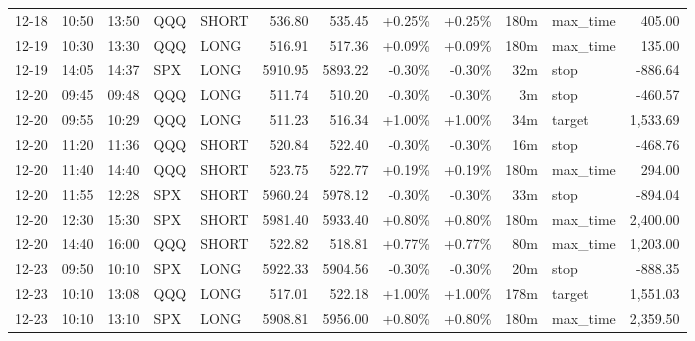 \documentclass[11pt,a4paper]{article}
\begin{document}
\begin{center}
\begin{longtable}{>{\color{txtmain}}l l l l l r r r r r >{\color{txtmain}}l r}
12-18 & 10:50 & 13:50 & QQQ & SHORT & 536.80 & 535.45 & \textcolor{wingreen}{+0.25\%} & \textcolor{wingreen}{+0.25\%} & 180m & max\_time & \textcolor{wingreen}{405.00} \\
12-19 & 10:30 & 13:30 & QQQ & LONG & 516.91 & 517.36 & \textcolor{wingreen}{+0.09\%} & \textcolor{wingreen}{+0.09\%} & 180m & max\_time & \textcolor{wingreen}{135.00} \\
12-19 & 14:05 & 14:37 & SPX & LONG & 5910.95 & 5893.22 & \textcolor{lossred}{-0.30\%} & \textcolor{lossred}{-0.30\%} & 32m & stop & \textcolor{lossred}{-886.64} \\
12-20 & 09:45 & 09:48 & QQQ & LONG & 511.74 & 510.20 & \textcolor{lossred}{-0.30\%} & \textcolor{lossred}{-0.30\%} & 3m & stop & \textcolor{lossred}{-460.57} \\
12-20 & 09:55 & 10:29 & QQQ & LONG & 511.23 & 516.34 & \textcolor{wingreen}{+1.00\%} & \textcolor{wingreen}{+1.00\%} & 34m & target & \textcolor{wingreen}{1,533.69} \\
12-20 & 11:20 & 11:36 & QQQ & SHORT & 520.84 & 522.40 & \textcolor{lossred}{-0.30\%} & \textcolor{lossred}{-0.30\%} & 16m & stop & \textcolor{lossred}{-468.76} \\
12-20 & 11:40 & 14:40 & QQQ & SHORT & 523.75 & 522.77 & \textcolor{wingreen}{+0.19\%} & \textcolor{wingreen}{+0.19\%} & 180m & max\_time & \textcolor{wingreen}{294.00} \\
12-20 & 11:55 & 12:28 & SPX & SHORT & 5960.24 & 5978.12 & \textcolor{lossred}{-0.30\%} & \textcolor{lossred}{-0.30\%} & 33m & stop & \textcolor{lossred}{-894.04} \\
12-20 & 12:30 & 15:30 & SPX & SHORT & 5981.40 & 5933.40 & \textcolor{wingreen}{+0.80\%} & \textcolor{wingreen}{+0.80\%} & 180m & max\_time & \textcolor{wingreen}{2,400.00} \\
12-20 & 14:40 & 16:00 & QQQ & SHORT & 522.82 & 518.81 & \textcolor{wingreen}{+0.77\%} & \textcolor{wingreen}{+0.77\%} & 80m & max\_time & \textcolor{wingreen}{1,203.00} \\
12-23 & 09:50 & 10:10 & SPX & LONG & 5922.33 & 5904.56 & \textcolor{lossred}{-0.30\%} & \textcolor{lossred}{-0.30\%} & 20m & stop & \textcolor{lossred}{-888.35} \\
12-23 & 10:10 & 13:08 & QQQ & LONG & 517.01 & 522.18 & \textcolor{wingreen}{+1.00\%} & \textcolor{wingreen}{+1.00\%} & 178m & target & \textcolor{wingreen}{1,551.03} \\
12-23 & 10:10 & 13:10 & SPX & LONG & 5908.81 & 5956.00 & \textcolor{wingreen}{+0.80\%} & \textcolor{wingreen}{+0.80\%} & 180m & max\_time & \textcolor{wingreen}{2,359.50} \\

\end{longtable}
\end{center}
\end{document}
